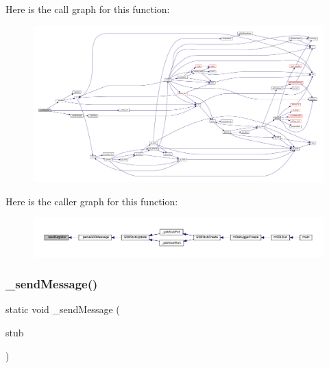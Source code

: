 Here is the call graph for this function\+:
\nopagebreak
\begin{figure}[H]
\begin{center}
\leavevmode
\includegraphics[width=350pt]{gdb-stub_8c_ab3eabf8dd23cecb74255396e87e72453_cgraph}
\end{center}
\end{figure}
Here is the caller graph for this function\+:
\nopagebreak
\begin{figure}[H]
\begin{center}
\leavevmode
\includegraphics[width=350pt]{gdb-stub_8c_ab3eabf8dd23cecb74255396e87e72453_icgraph}
\end{center}
\end{figure}
\mbox{\label{gdb-stub_8c_abb9ab714ec89c5c39435215b2f48517c}} 
\subsubsection{\texorpdfstring{\+\_\+send\+Message()}{\_sendMessage()}}
{\footnotesize\ttfamily static void \+\_\+send\+Message (\begin{DoxyParamCaption}\item[{struct G\+D\+B\+Stub $\ast$}]{stub }\end{DoxyParamCaption})\hspace{0.3cm}{\ttfamily [static]}}

